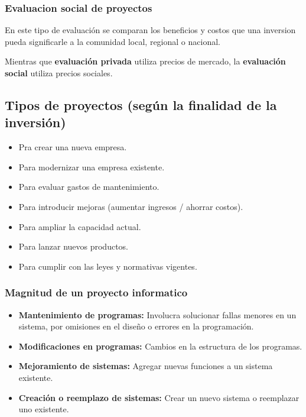 \documentclass{templateNote}
\begin{document}
\subsubsection{Evaluacion social de proyectos}
En este tipo de evaluación se comparan los beneficios y costos que una inversion pueda significarle a la comunidad local, regional o nacional.

Mientras que \textbf{evaluación privada} utiliza precios de mercado, la \textbf{evaluación social} utiliza precios sociales. 

\subsection{Tipos de proyectos (según la finalidad de la inversión)}
\begin{itemize}
    \item Pra crear una nueva empresa.
    \item Para modernizar una empresa existente.
    \item Para evaluar gastos de mantenimiento.
    \item Para introducir mejoras (aumentar ingresos / ahorrar costos).
    \item Para ampliar la capacidad actual.
    \item Para lanzar nuevos productos.
    \item Para cumplir con las leyes y normativas vigentes.
\end{itemize}

\subsubsection{Magnitud de un proyecto informatico}
\begin{itemize}
    \item \textbf{Mantenimiento de programas:} Involucra solucionar fallas menores en un sistema, por omisiones en el diseño o errores en la programación.
    \item \textbf{Modificaciones en programas:} Cambios en la estructura de los programas.
    \item \textbf{Mejoramiento de sistemas:} Agregar nuevas funciones a un sistema existente.
    \item \textbf{Creación o reemplazo de sistemas:} Crear un nuevo sistema o reemplazar uno existente.
\end{itemize}
\end{document}
